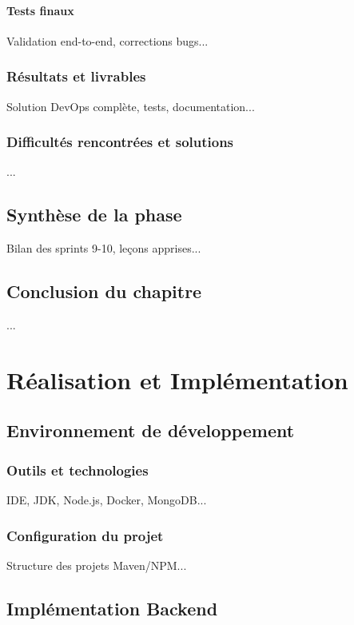 \documentclass[12pt,a4paper]{report}
\begin{document}
\subsubsection{Tests finaux}
Validation end-to-end, corrections bugs...

\subsection{Résultats et livrables}
Solution DevOps complète, tests, documentation...

\subsection{Difficultés rencontrées et solutions}
...

\section{Synthèse de la phase}
Bilan des sprints 9-10, leçons apprises...

\section{Conclusion du chapitre}
...

\chapter{Réalisation et Implémentation}
\label{chap:realisation}

\section{Environnement de développement}
\subsection{Outils et technologies}
IDE, JDK, Node.js, Docker, MongoDB...

\subsection{Configuration du projet}
Structure des projets Maven/NPM...

\section{Implémentation Backend}
\end{document}
